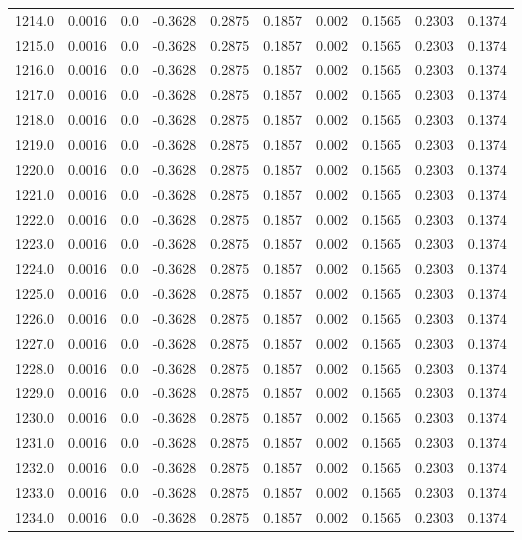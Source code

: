 \begin{longtable}{lrrrrrrrrr}
1214.0 & 0.0016 & 0.0 & -0.3628 & 0.2875 & 0.1857 & 0.002 & 0.1565 & 0.2303 & 0.1374 \\
1215.0 & 0.0016 & 0.0 & -0.3628 & 0.2875 & 0.1857 & 0.002 & 0.1565 & 0.2303 & 0.1374 \\
1216.0 & 0.0016 & 0.0 & -0.3628 & 0.2875 & 0.1857 & 0.002 & 0.1565 & 0.2303 & 0.1374 \\
1217.0 & 0.0016 & 0.0 & -0.3628 & 0.2875 & 0.1857 & 0.002 & 0.1565 & 0.2303 & 0.1374 \\
1218.0 & 0.0016 & 0.0 & -0.3628 & 0.2875 & 0.1857 & 0.002 & 0.1565 & 0.2303 & 0.1374 \\
1219.0 & 0.0016 & 0.0 & -0.3628 & 0.2875 & 0.1857 & 0.002 & 0.1565 & 0.2303 & 0.1374 \\
1220.0 & 0.0016 & 0.0 & -0.3628 & 0.2875 & 0.1857 & 0.002 & 0.1565 & 0.2303 & 0.1374 \\
1221.0 & 0.0016 & 0.0 & -0.3628 & 0.2875 & 0.1857 & 0.002 & 0.1565 & 0.2303 & 0.1374 \\
1222.0 & 0.0016 & 0.0 & -0.3628 & 0.2875 & 0.1857 & 0.002 & 0.1565 & 0.2303 & 0.1374 \\
1223.0 & 0.0016 & 0.0 & -0.3628 & 0.2875 & 0.1857 & 0.002 & 0.1565 & 0.2303 & 0.1374 \\
1224.0 & 0.0016 & 0.0 & -0.3628 & 0.2875 & 0.1857 & 0.002 & 0.1565 & 0.2303 & 0.1374 \\
1225.0 & 0.0016 & 0.0 & -0.3628 & 0.2875 & 0.1857 & 0.002 & 0.1565 & 0.2303 & 0.1374 \\
1226.0 & 0.0016 & 0.0 & -0.3628 & 0.2875 & 0.1857 & 0.002 & 0.1565 & 0.2303 & 0.1374 \\
1227.0 & 0.0016 & 0.0 & -0.3628 & 0.2875 & 0.1857 & 0.002 & 0.1565 & 0.2303 & 0.1374 \\
1228.0 & 0.0016 & 0.0 & -0.3628 & 0.2875 & 0.1857 & 0.002 & 0.1565 & 0.2303 & 0.1374 \\
1229.0 & 0.0016 & 0.0 & -0.3628 & 0.2875 & 0.1857 & 0.002 & 0.1565 & 0.2303 & 0.1374 \\
1230.0 & 0.0016 & 0.0 & -0.3628 & 0.2875 & 0.1857 & 0.002 & 0.1565 & 0.2303 & 0.1374 \\
1231.0 & 0.0016 & 0.0 & -0.3628 & 0.2875 & 0.1857 & 0.002 & 0.1565 & 0.2303 & 0.1374 \\
1232.0 & 0.0016 & 0.0 & -0.3628 & 0.2875 & 0.1857 & 0.002 & 0.1565 & 0.2303 & 0.1374 \\
1233.0 & 0.0016 & 0.0 & -0.3628 & 0.2875 & 0.1857 & 0.002 & 0.1565 & 0.2303 & 0.1374 \\
1234.0 & 0.0016 & 0.0 & -0.3628 & 0.2875 & 0.1857 & 0.002 & 0.1565 & 0.2303 & 0.1374 \\

\end{longtable}

